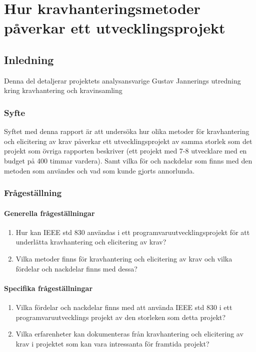 \chapter{Hur kravhanteringsmetoder påverkar ett utvecklingsprojekt}
\label{cha:indiv-report-jannering}

\section{Inledning}
\label{sec:introduction-jannering}

Denna del detaljerar projektets analysansvarige Gustav Jannerings utredning kring kravhantering och kravinsamling

\subsection{Syfte}
\label{sec:purpose-jannering}


Syftet med denna rapport är att undersöka hur olika metoder för kravhantering och elicitering av krav påverkar ett utvecklingsprojekt av samma storlek som det projekt som övriga rapporten beskriver (ett projekt med 7-8 utvecklare med en budget på 400 timmar vardera). Samt vilka för och nackdelar som finns med den metoden som användes och vad som kunde gjorts annorlunda.

\subsection{Frågeställning}
\label{sec:issue-jannering}

\subsubsection{Generella frågeställningar}
\begin{enumerate}
	\item Hur kan IEEE std 830 användas i ett programvaruutvecklingsprojekt för att underlätta kravhantering och elicitering av krav?
	
	\item Vilka metoder finns för kravhantering och elicitering av krav och vilka fördelar och nackdelar finns med dessa? 
\end{enumerate}
\subsubsection{Specifika frågeställningar}
\begin{enumerate}
	\item Vilka fördelar och nackdelar finns med att använda IEEE std 830 i ett programvaruutvecklings projekt av den storleken som detta projekt?
	
	\item Vilka erfarenheter kan dokumenteras från kravhantering och elicitering av krav i projektet som kan vara intressanta
	för framtida projekt?
	
\end{enumerate}

